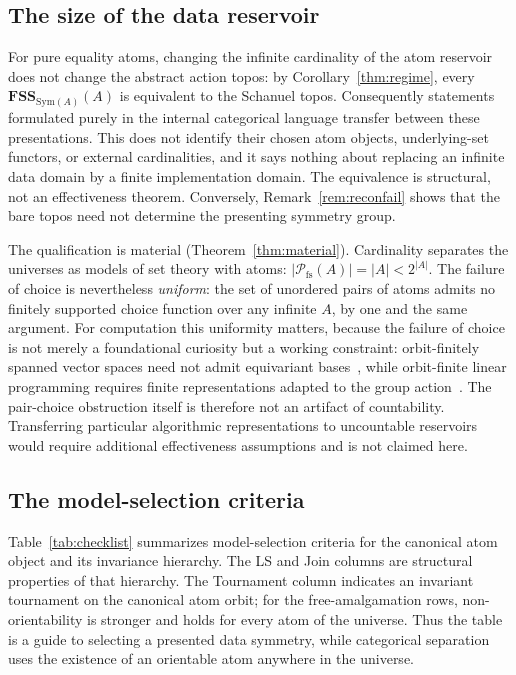 \documentclass{lmcs}
\newcommand{\Sym}{\mathrm{Sym}}
\newcommand{\fs}{\mathrm{fs}}
\newcommand{\FSS}{\mathbf{FSS}}
\newcommand{\Pfs}{\mathcal{P}_{\fs}}
\begin{document}
\subsection{The size of the data reservoir}
\label{subsec:reservoir}

For pure equality atoms, changing the infinite cardinality of the atom
reservoir does not change the abstract action topos: by
Corollary~\ref{thm:regime}, every $\FSS_{\Sym(A)}(A)$ is equivalent to the
Schanuel topos. Consequently statements formulated purely in the internal
categorical language transfer between these presentations. This does not
identify their chosen atom objects, underlying-set functors, or external
cardinalities, and it says nothing about replacing an infinite data domain by
a finite implementation domain. The equivalence is structural, not an
effectiveness theorem. Conversely, Remark~\ref{rem:reconfail} shows that
the bare topos need not determine the presenting symmetry group.

The qualification is material (Theorem~\ref{thm:material}). Cardinality
separates the universes as models of set theory with atoms:
$|\Pfs(A)|=|A|<2^{|A|}$. The failure of choice is nevertheless
\emph{uniform}: the set of unordered pairs of atoms admits no finitely
supported choice function over any infinite $A$, by one and the same
argument. For computation this uniformity matters, because the failure of
choice is not merely a foundational curiosity but a working constraint:
orbit-finitely spanned vector spaces need not admit equivariant
bases~\cite{BFKM24}, while orbit-finite linear programming requires finite
representations adapted to the group action~\cite{GHL23}. The
pair-choice obstruction itself is therefore not an artifact of
countability. Transferring particular algorithmic representations to
uncountable reservoirs would require additional effectiveness
assumptions and is not claimed here.

\subsection{The model-selection criteria}\label{subsec:checklist}

Table~\ref{tab:checklist} summarizes model-selection criteria for the canonical atom object and its invariance hierarchy. The LS and Join columns are structural properties of that hierarchy. The Tournament column indicates an invariant tournament on the canonical atom orbit; for the free-amalgamation rows, non-orientability is stronger and holds for every atom of the universe. Thus the table is a guide to selecting a presented data symmetry, while categorical separation uses the existence of an orientable atom anywhere in the universe.
\end{document}
